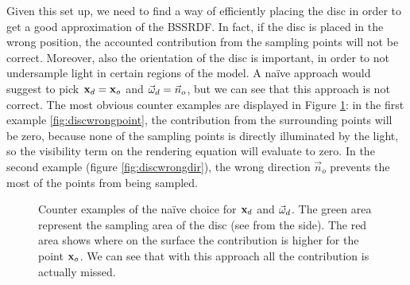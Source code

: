 Given this set up, we need to find a way of efficiently placing the disc in order to get a good approximation of the BSSRDF. In fact, if the disc is placed in the wrong position, the accounted contribution from the sampling points will not be correct. Moreover, also the orientation of the disc is important, in order to not undersample light in certain regions of the model. A na\"{i}ve approach would suggest to pick $\mathbf{x}_d = \mathbf{x}_o$ and $\vec{\omega}_d = \vec{n}_o$, but we can see that this approach is not correct. The most obvious counter examples are displayed in Figure \ref{fig:discwrong}: in the first example \ref{fig:discwrongpoint}, the contribution from the surrounding points will be zero, because none of the sampling points is directly illuminated by the light, so the visibility term on the rendering equation will evaluate to zero. In the second example (figure \ref{fig:discwrongdir}), the wrong direction $\vec{n}_o$ prevents the most of the points from being sampled.

\begin{figure}
\centering
{}
\caption{Counter examples of the na\"{i}ve choice for $\mathbf{x}_d$ and $\vec{\omega}_d$. The green area represent the sampling area of the disc (see from the side). The red area shows where on the surface the contribution is higher for the point $\mathbf{x}_o$. We can see that with this approach all the contribution is actually missed.}
\label{fig:discwrong}
\end{figure}

